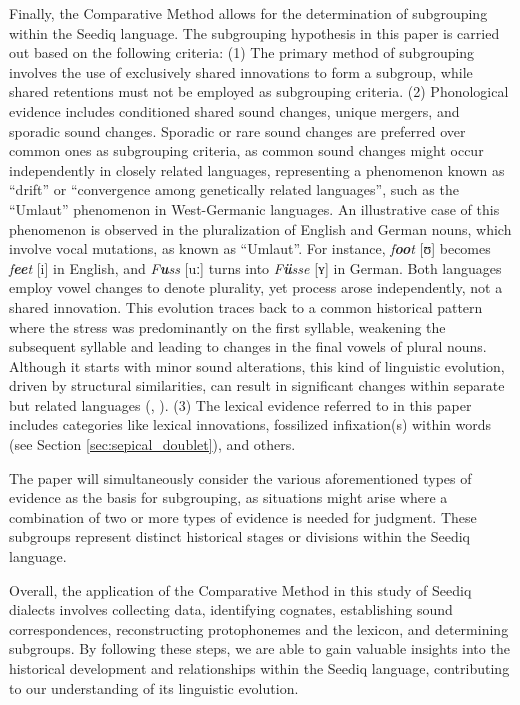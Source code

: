 Finally, the Comparative Method allows for the determination of subgrouping within the Seediq language. The subgrouping hypothesis in this paper is carried out based on the following criteria: (1) The primary method of subgrouping involves the use of exclusively shared innovations to form a subgroup, while shared retentions must not be employed as subgrouping criteria. (2) Phonological evidence includes conditioned shared sound changes, unique mergers, and sporadic sound changes. Sporadic or rare sound changes are preferred over common ones as subgrouping criteria, as common sound changes might occur independently in closely related languages, representing a phenomenon known as ``drift'' or ``convergence among genetically related languages'', such as the ``Umlaut'' phenomenon in West-Germanic languages. An illustrative case of this phenomenon is observed in the pluralization of English and German nouns, which involve vocal mutations, as known as ``Umlaut''. For instance, \textit{f\textbf{oo}t} [ʊ] becomes \textit{f\textbf{ee}t} [i] in English, and \textit{F\textbf{u}ss} [uː] turns into \textit{F\textbf{ü}sse} [ʏ] in German. Both languages employ vowel changes to denote plurality, yet process arose independently, not a shared innovation. This evolution traces back to a common historical pattern where the stress was predominantly on the first syllable, weakening the subsequent syllable and leading to changes in the final vowels of plural nouns. Although it starts with minor sound alterations, this kind of linguistic evolution, driven by structural similarities, can result in significant changes within separate but related languages (\cite[47--48]{greenberg1957subgroupings}, \cite{sapir1921language}). (3) The lexical evidence referred to in this paper includes categories like lexical innovations, fossilized infixation(s) within words (see Section \ref{sec:sepical_doublet}), and others.

The paper will simultaneously consider the various aforementioned types of evidence as the basis for subgrouping, as situations might arise where a combination of two or more types of evidence is needed for judgment. These subgroups represent distinct historical stages or divisions within the Seediq language.

Overall, the application of the Comparative Method in this study of Seediq dialects involves collecting data, identifying cognates, establishing sound correspondences, reconstructing protophonemes and the lexicon, and determining subgroups. By following these steps, we are able to gain valuable insights into the historical development and relationships within the Seediq language, contributing to our understanding of its linguistic evolution.

